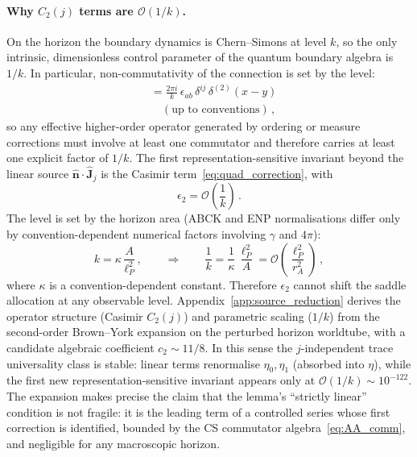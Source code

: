 \documentclass[aps,prd,twocolumn,10pt,superscriptaddress,nofootinbib]{revtex4-2}
\begin{document}
\paragraph{Why $C_2(j)$ terms are $\mathcal{O}(1/k)$.}

On the horizon the boundary dynamics is Chern--Simons at level
$k$, so the only intrinsic, dimensionless control parameter of
the quantum boundary algebra is $1/k$.  In particular,
non-commutativity of the connection is set by the level:
\begin{align}
[\hat{A}^i_a(x),\,\hat{A}^j_b(y)]
  &= \frac{2\pi i}{k}\,\epsilon_{ab}\,\delta^{ij}\,
    \delta^{(2)}(x-y)
\nonumber \\
  &\quad(\text{up to conventions})\,,
\label{eq:AA_comm}
\end{align}
so any effective higher-order operator generated by
ordering or measure corrections must involve at least one
commutator and therefore carries at least one explicit factor of
$1/k$.  The first representation-sensitive invariant beyond the
linear source $\hat{\mathbf{n}}\!\cdot\!\hat{\mathbf{J}}_j$ is
the Casimir term~\eqref{eq:quad_correction}, with
\begin{equation}
\epsilon_2 = \mathcal{O}\!\left(\frac{1}{k}\right)\,.
\label{eq:eps2_from_comm}
\end{equation}
The level is set by the horizon area (ABCK and ENP normalisations
differ only by convention-dependent numerical factors involving
$\gamma$ and $4\pi$):
\begin{equation}
k = \kappa\,\frac{A}{\ell_P^2}\,,
  \qquad\Longrightarrow\qquad
  \frac{1}{k} = \frac{1}{\kappa}\,\frac{\ell_P^2}{A}
  = \mathcal{O}\!\left(\frac{\ell_P^2}{r_A^2}\right)\,,
\label{eq:eps2_bound}
\end{equation}
where $\kappa$ is a convention-dependent constant.
Therefore $\epsilon_2$ cannot shift the saddle allocation at any
observable level.  Appendix~\ref{app:source_reduction} derives the
operator structure (Casimir $C_2(j)$) and parametric scaling
($1/k$) from the second-order Brown--York expansion on the
perturbed horizon worldtube, with a candidate algebraic
coefficient $c_2 \sim 11/8$.  In this sense the $j$-independent trace
universality class is stable: linear terms renormalise
$\eta_0, \eta_1$ (absorbed into $\eta$), while the first new
representation-sensitive invariant appears only at
$\mathcal{O}(1/k) \sim 10^{-122}$.  The expansion makes precise
the claim that the lemma's ``strictly linear'' condition is not
fragile: it is the leading term of a controlled series whose first
correction is identified, bounded by the CS commutator
algebra~\eqref{eq:AA_comm}, and negligible for any macroscopic
horizon.
\end{document}
